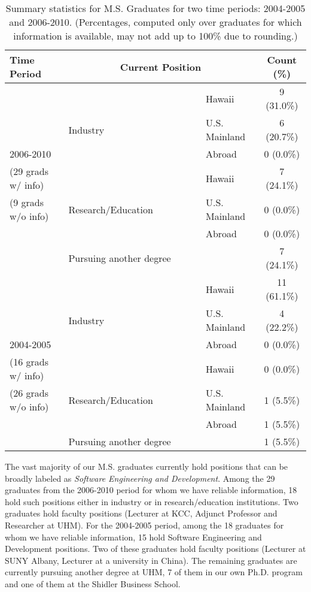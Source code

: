 \documentclass[12pt]{article}
\begin{document}
\begin{table}[Bth]
\begin{center}
\caption{Summary statistics for M.S. Graduates for two time periods:
	 2004-2005 and 2006-2010. (Percentages, computed only over
	 graduates for which information is available, may not add up to 100\% due to rounding.)}
\label{tab.ms_summary}
\begin{tabular}{|l|l|l|c|}
\hline
Time Period & \multicolumn{2}{c|}{Current Position} & Count (\%)\\
\hline
\hline
     &                                  & Hawaii        & 9 (31.0\%)\\
\cline{3-4}
     & Industry                         & U.S. Mainland & 6 (20.7\%)\\
\cline{3-4}
2006-2010     &                         & Abroad        & 0 (0.0\%)\\
\cline{2-4}
(29 grads w/ info) &                    & Hawaii        & 7 (24.1\%)\\
\cline{3-4}
(9 grads w/o info) & Research/Education~~~~~~~~~ & U.S. Mainland & 0 (0.0\%)\\
\cline{3-4}
                 &                      & Abroad        & 0 (0.0\%)\\
\cline{2-4}
                 & \multicolumn{2}{l|}{Pursuing another degree} & 7 (24.1\%)\\
\hline
     &                                   & Hawaii        & 11 (61.1\%)\\
\cline{3-4}
     & Industry                          & U.S. Mainland & 4 (22.2\%)\\
\cline{3-4}
2004-2005     &                          & Abroad        & 0 (0.0\%)\\
\cline{2-4}
(16 grads w/ info) &                     & Hawaii        & 0 (0.0\%)\\
\cline{3-4}
(26 grads w/o info) & Research/Education & U.S. Mainland & 1 (5.5\%)\\
\cline{3-4}
                 &                       & Abroad        & 1 (5.5\%)\\
\cline{2-4}
                 & \multicolumn{2}{l|}{Pursuing another degree} & 1 (5.5\%)\\

\hline
\end{tabular}
\end{center}
\end{table}

The vast majority of our M.S. graduates currently hold positions that
can be broadly labeled as \emph{Software Engineering and Development}. Among
the 29 graduates from the 2006-2010 period for whom we have reliable
information, 18 hold such positions either in industry or in
research/education institutions.  Two graduates hold faculty positions
(Lecturer at KCC, Adjunct Professor and Researcher at UHM). For the
2004-2005 period, among the 18 graduates for whom we have reliable
information, 15 hold Software Engineering and Development positions. Two of
these graduates hold faculty positions (Lecturer at SUNY Albany,
Lecturer at a university in China). The remaining graduates are
currently pursuing another degree at UHM, 7 of them in our own Ph.D.
program and one of them at the Shidler Business School.
\end{document}
